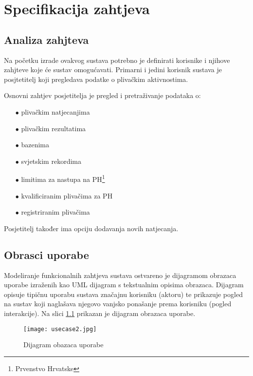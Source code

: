 \documentclass[times, utf8, zavrsni]{fer}
\begin{document}
\chapter{Specifikacija zahtjeva}

\section{Analiza zahjteva}
Na početku izrade ovakvog sustava potrebno je definirati korisnike i njihove zahjteve koje će sustav omogućavati.
Primarni i jedini korisnik sustava je posjtetitelj koji pregledava podatke o plivačkim aktivnostima.

\noindent Osnovni zahtjev posjetitelja je pregled i pretraživanje podataka o:
\begin{itemize}
    \item[$\bullet$] plivačkim natjecanjima
    \item[$\bullet$] plivačkim rezultatima
    \item[$\bullet$] bazenima
    \item[$\bullet$] svjetskim rekordima
    \item[$\bullet$] limitima za nastupa na PH\footnote{Prvenstvo Hrvatske}
    \item[$\bullet$] kvalificiranim plivačima za PH
    \item[$\bullet$] registriranim plivačima
\end{itemize}


\noindent Posjetitelj također ima opciju dodavanja novih natjecanja.



\section{Obrasci uporabe}

Modeliranje funkcionalnih zahtjeva sustava ostvareno je dijagramom obrazaca uporabe  izraženih kao UML dijagram
s tekstualnim opisima obrazaca. Dijagram opisuje tipičnu uporabu sustava značajnu korisniku (aktoru) te prikazuje pogled na sustav koji naglašava njegovo
vanjsko ponašanje prema korisniku (pogled interakcije). Na slici \ref{fig:use-case} prikazan je dijagram obrazaca uporabe.



\begin{figure}[htb]
    \centering
    \hspace*{-2.5cm}
    \texttt{[image: usecase2.jpg]}
    \centering
    \caption{Dijagram obazaca uporabe}
    \label{fig:use-case}
\end{figure}
\end{document}
